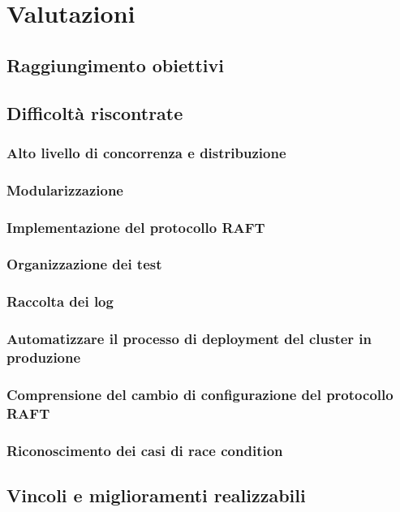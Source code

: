 
\section{Valutazioni}
\subsection{Raggiungimento obiettivi}

\subsection{Difficoltà riscontrate}
\subsubsection{Alto livello di concorrenza e distribuzione}

\subsubsection{Modularizzazione}

\subsubsection{Implementazione del protocollo RAFT}

\subsubsection{Organizzazione dei test}

\subsubsection{Raccolta dei log}

\subsubsection{Automatizzare il processo di deployment del cluster in produzione}

\subsubsection{Comprensione del cambio di configurazione del protocollo RAFT}

\subsubsection{Riconoscimento dei casi di race condition}

\subsection{Vincoli e miglioramenti realizzabili}
